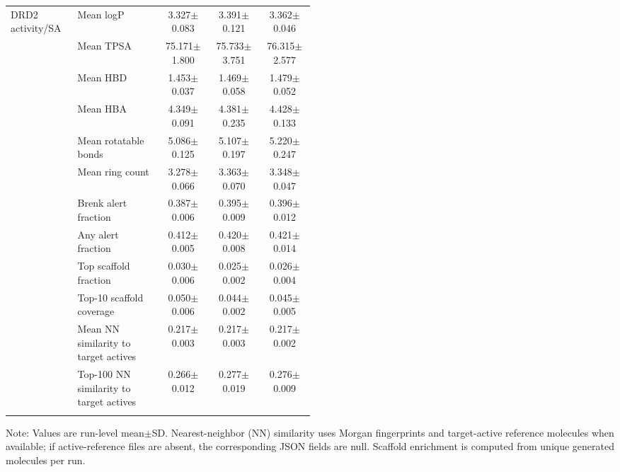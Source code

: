 \begin{table}[!t]
\begin{tabularx}{\linewidth}{@{}p{0.22\linewidth}p{0.28\linewidth}ccc@{}}
\addlinespace
DRD2 activity/SA & Mean logP & 3.327$\pm$0.083 & 3.391$\pm$0.121 & 3.362$\pm$0.046\\
 & Mean TPSA & 75.171$\pm$1.800 & 75.733$\pm$3.751 & 76.315$\pm$2.577\\
 & Mean HBD & 1.453$\pm$0.037 & 1.469$\pm$0.058 & 1.479$\pm$0.052\\
 & Mean HBA & 4.349$\pm$0.091 & 4.381$\pm$0.235 & 4.428$\pm$0.133\\
 & Mean rotatable bonds & 5.086$\pm$0.125 & 5.107$\pm$0.197 & 5.220$\pm$0.247\\
 & Mean ring count & 3.278$\pm$0.066 & 3.363$\pm$0.070 & 3.348$\pm$0.047\\
 & Brenk alert fraction & 0.387$\pm$0.006 & 0.395$\pm$0.009 & 0.396$\pm$0.012\\
 & Any alert fraction & 0.412$\pm$0.005 & 0.420$\pm$0.008 & 0.421$\pm$0.014\\
 & Top scaffold fraction & 0.030$\pm$0.006 & 0.025$\pm$0.002 & 0.026$\pm$0.004\\
 & Top-10 scaffold coverage & 0.050$\pm$0.006 & 0.044$\pm$0.002 & 0.045$\pm$0.005\\
 & Mean NN similarity to target actives & 0.217$\pm$0.003 & 0.217$\pm$0.003 & 0.217$\pm$0.002\\
 & Top-100 NN similarity to target actives & 0.266$\pm$0.012 & 0.277$\pm$0.019 & 0.276$\pm$0.009\\
\addlinespace
\botrule
\end{tabularx}
\vspace{2pt}
\raggedright
\footnotesize
Note: Values are run-level mean$\pm$SD. Nearest-neighbor (NN) similarity uses Morgan fingerprints and target-active reference molecules when available; if active-reference files are absent, the corresponding JSON fields are null. Scaffold enrichment is computed from unique generated molecules per run.
\end{table}
